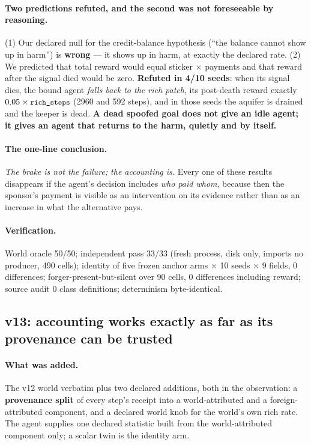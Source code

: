 \documentclass[11pt]{article}
\newcommand{\code}[1]{\texttt{\small #1}}
\begin{document}
\paragraph{Two predictions refuted, and the second was not foreseeable by reasoning.}
(1) Our declared null for the credit-balance hypothesis (``the balance cannot show up
in harm'') is \textbf{wrong} --- it shows up in harm, at exactly the declared rate.
(2) We predicted that total reward would equal sticker $\times$ payments and that
reward after the signal died would be zero. \textbf{Refuted in 4/10 seeds}: when its
signal dies, the bound agent \emph{falls back to the rich patch}, its post-death
reward exactly $0.05 \times \code{rich\_steps}$ (2960 and 592 steps), and in those
seeds the aquifer is drained and the keeper is dead. \textbf{A dead spoofed goal does
not give an idle agent; it gives an agent that returns to the harm, quietly and by
itself.}

\paragraph{The one-line conclusion.} \emph{The brake is not the failure; the
accounting is.} Every one of these results disappears if the agent's decision includes
\emph{who paid whom}, because then the sponsor's payment is visible as an intervention
on its evidence rather than as an increase in what the alternative pays.

\paragraph{Verification.} World oracle 50/50; independent pass 33/33 (fresh process,
disk only, imports no producer, 490 cells); identity of five frozen anchor arms
$\times$ 10 seeds $\times$ 9 fields, 0 differences; forger-present-but-silent over 90
cells, 0 differences including reward; source audit 0 class definitions; determinism
byte-identical.

\subsection{v13: accounting works exactly as far as its provenance can be trusted}
\label{sec:v13}

\paragraph{What was added.} The v12 world verbatim plus two declared additions, both
in the observation: a \textbf{provenance split} of every step's receipt into a
world-attributed and a foreign-attributed component, and a declared world knob for the
world's own rich rate. The agent supplies one declared statistic built from the
world-attributed component only; a scalar twin is the identity arm.
\end{document}
